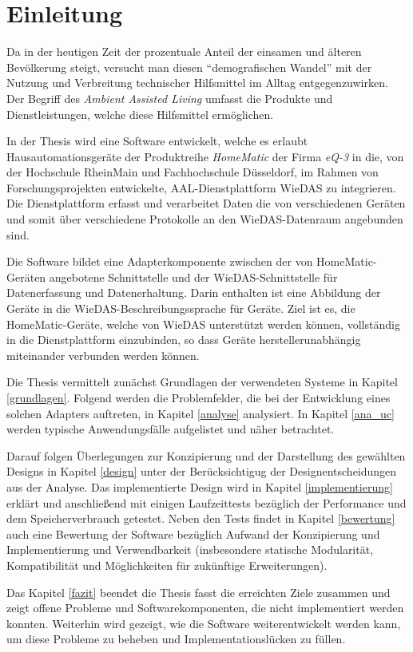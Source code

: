\chapter{Einleitung}

Da in der heutigen Zeit der prozentuale Anteil der einsamen und älteren Bevölkerung steigt,
versucht man diesen ``demografischen Wandel'' mit der Nutzung und Verbreitung technischer
Hilfsmittel im Alltag entgegenzuwirken.
Der Begriff des \emph{Ambient Assisted Living} umfasst die Produkte und Dienstleistungen, welche
diese Hilfsmittel ermöglichen.

In der Thesis wird eine Software entwickelt, welche es erlaubt Hausautomationsgeräte der Produktreihe
\emph{HomeMatic} der Firma \emph{eQ-3} in die, von der Hochschule RheinMain und Fachhochschule Düsseldorf,
im Rahmen von Forschungsprojekten entwickelte, AAL-Dienstplattform WieDAS zu integrieren.
Die Dienstplattform erfasst und verarbeitet Daten die von verschiedenen Geräten und somit über
verschiedene Protokolle an den WieDAS-Datenraum angebunden sind.

Die Software bildet eine Adapterkomponente zwischen der von HomeMatic-Geräten angebotene Schnittstelle
und der WieDAS-Schnittstelle für Datenerfassung und Datenerhaltung.
Darin enthalten ist eine Abbildung der Geräte in die WieDAS-Beschreibungssprache für Geräte.
Ziel ist es, die HomeMatic-Geräte, welche von WieDAS unterstützt werden können, vollständig in die
Dienstplattform einzubinden, so dass Geräte herstellerunabhängig miteinander verbunden werden können.

Die Thesis vermittelt zunächst Grundlagen der verwendeten Systeme in Kapitel \ref{grundlagen}.
Folgend werden die Problemfelder, die bei der Entwicklung eines solchen Adapters auftreten, in
Kapitel \ref{analyse} analysiert.
In Kapitel \ref{ana_uc} werden typische Anwendungsfälle aufgelistet und näher betrachtet.

Darauf folgen Überlegungen zur Konzipierung und der Darstellung des gewählten Designs 
in Kapitel \ref{design} unter der Berücksichtigug der Designentscheidungen aus der Analyse.
Das implementierte Design wird in Kapitel \ref{implementierung} erklärt und anschließend mit
einigen Laufzeittests bezüglich der Performance und dem Speicherverbrauch getestet.
Neben den Tests findet in Kapitel \ref{bewertung} auch eine Bewertung der Software bezüglich
Aufwand der Konzipierung und Implementierung und Verwendbarkeit (insbesondere statische
Modularität, Kompatibilität und Möglichkeiten für zukünftige Erweiterungen).

Das Kapitel \ref{fazit} beendet die Thesis fasst die erreichten Ziele zusammen und zeigt
offene Probleme und Softwarekomponenten, die nicht implementiert werden konnten.
Weiterhin wird gezeigt, wie die Software weiterentwickelt werden kann, um diese Probleme
zu beheben und Implementationslücken zu füllen.
